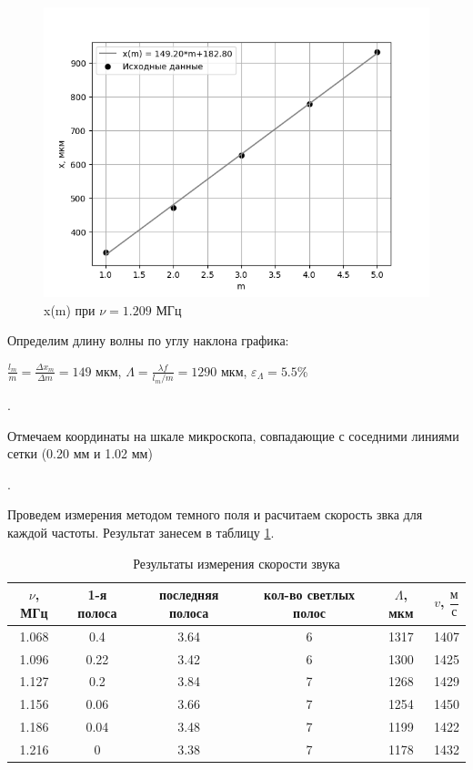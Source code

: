 \documentclass[a4paper, 12pt]{article}
\newcounter{Points}
\newcommand{\point}{\arabic{Points}. \addtocounter{Points}{1}}
\begin{document}
\begin{figure}[H]
    \centering
    \includegraphics[width=0.6\linewidth]{graph3.png}
    \caption{x(m) при $\nu = 1.209$ МГц}
    \label{fig:graph_3}
\end{figure}

Определим длину волны по углу наклона графика:
\begin{center}
    $\frac{l_m}{m} = \frac{\Delta x_m}{\Delta m} = 149$ мкм,
    $\Lambda = \frac{\lambda f}{l_m/m} = 1290$ мкм,
    $\varepsilon_{\Lambda} = 5.5$\%
\end{center}

\point Отмечаем координаты на шкале микроскопа, совпадающие с соседними 
линиями сетки (0.20 мм и 1.02 мм)

\point Проведем измерения методом темного поля и расчитаем скорость звка для каждой частоты. Результат занесем в таблицу \ref{tabl:data_dark_field}.

\begin{table}[H]
    \centering
    \begin{tabular}{|c|c|c|c|c|c|}
        \hline
        $\nu$, МГц & 1-я полоса & последняя полоса & кол-во светлых полос & $\Lambda$, мкм & $v$, $\dfrac{м}{с}$    \\ \hline
        1.068      & 0.4        & 3.64             & 6                    & 1317           & 1407                   \\ \hline
        1.096      & 0.22       & 3.42             & 6                    & 1300           & 1425                   \\ \hline
        1.127      & 0.2        & 3.84             & 7                    & 1268           & 1429                   \\ \hline
        1.156      & 0.06       & 3.66             & 7                    & 1254           & 1450                   \\ \hline
        1.186      & 0.04       & 3.48             & 7                    & 1199           & 1422                   \\ \hline
        1.216      & 0          & 3.38             & 7                    & 1178           & 1432                   \\ \hline
    \end{tabular}
    \caption{Результаты измерения скорости звука}
    \label{tabl:data_dark_field}
\end{table}
\end{document}
